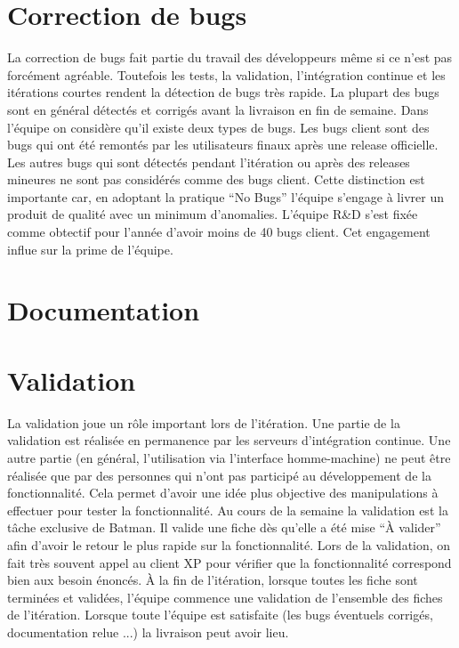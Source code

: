 \section{Correction de bugs}
La correction de bugs fait partie du travail des développeurs même si ce n'est pas forcément agréable. Toutefois les tests, la validation, l'intégration continue et les itérations courtes rendent la détection de bugs très rapide. La plupart des bugs sont en général détectés et corrigés avant la livraison en fin de semaine. Dans l'équipe on considère qu'il existe deux types de bugs. Les bugs client sont des bugs qui ont été remontés par les utilisateurs finaux après une release officielle. Les autres bugs qui sont détectés pendant l'itération ou après des releases mineures ne sont pas considérés comme des bugs client. Cette distinction est importante car, en adoptant la pratique ``No Bugs'' l'équipe s'engage à livrer un produit de qualité avec un minimum d'anomalies. L'équipe R\&D s'est fixée comme obtectif pour l'année d'avoir moins de 40 bugs client. Cet engagement influe sur la prime de l'équipe.

\section{Documentation}


\section{Validation}
La validation joue un rôle important lors de l'itération. Une partie de la validation est réalisée en permanence par les serveurs d'intégration continue. Une autre partie (en général, l'utilisation via l'interface homme-machine) ne peut être réalisée que par des personnes qui n'ont pas participé au développement de la fonctionnalité. Cela permet d'avoir une idée plus objective des manipulations à effectuer pour tester la fonctionnalité. Au cours de la semaine la validation est la tâche exclusive de Batman. Il valide une fiche dès qu'elle a été mise ``À valider'' afin d'avoir le retour le plus rapide sur la fonctionnalité. Lors de la validation, on fait très souvent appel au client XP pour vérifier que la fonctionnalité correspond bien aux besoin énoncés. À la fin de l'itération, lorsque toutes les fiche sont terminées et validées, l'équipe commence une validation de l'ensemble des fiches de l'itération. Lorsque toute l'équipe est satisfaite (les bugs éventuels corrigés, documentation relue ...) la livraison peut avoir lieu.

